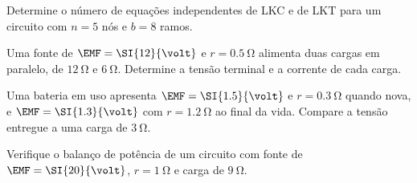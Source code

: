 \begin{questao}[2]{}

Determine o número de equações independentes de LKC e de LKT para um circuito
com $n=5$ nós e $b=8$ ramos.


\end{questao}
\begin{questao}[2]{}

Uma fonte de $\EMF=\SI{12}{\volt}$ e $r=\SI{0.5}{\ohm}$ alimenta duas cargas
em paralelo, de $\SI{12}{\ohm}$ e $\SI{6}{\ohm}$. Determine a tensão terminal e
a corrente de cada carga.


\end{questao}
\begin{questao}[2]{}

Uma bateria em uso apresenta $\EMF=\SI{1.5}{\volt}$ e $r=\SI{0.3}{\ohm}$
quando nova, e $\EMF=\SI{1.3}{\volt}$ com $r=\SI{1.2}{\ohm}$ ao final da vida.
Compare a tensão entregue a uma carga de $\SI{3}{\ohm}$.


\end{questao}
\begin{questao}[2]{}

Verifique o balanço de potência de um circuito com fonte de
$\EMF=\SI{20}{\volt}$, $r=\SI{1}{\ohm}$ e carga de $\SI{9}{\ohm}$.


\end{questao}

